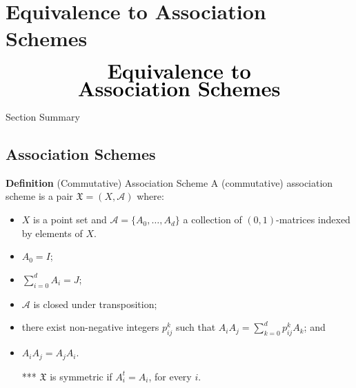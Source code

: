 \documentclass{beamer}
\begin{document}

\section{Equivalence to Association Schemes}

\begin{frame}
  \[
    \begin{array}{c}
      \text{\huge\bf Equivalence to}
      \\
      \text{\huge\bf Association Schemes}
    \end{array}
  \]
\end{frame}

\begin{frame}{Section Summary}
  \tableofcontents[sections={5}]
\end{frame}


\subsection{Association Schemes}

\begin{frame}

  \begin{block}{{\bf Definition} (Commutative) Association Scheme}
    A (commutative) association scheme is a pair $\mathfrak{X}=(X,\mathscr{A})$
    where:
    \begin{itemize}
    \item $X$ is a point set and $\mathscr{A}=\{A_0, \dots, A_d\}$ a collection
      of $(0,1)$-matrices indexed by elements of $X$.
    \item $A_0=I$;
    \item $\displaystyle{\sum_{i=0}^d A_i} = J$;
    \item $\mathscr{A}$ is closed under transposition;
    \item there exist non-negative integers $p_{ij}^k$ such that $A_iA_j =
      \displaystyle{\sum_{k=0}^d p_{ij}^kA_k}$; and
    \item $A_iA_j=A_jA_i$.
    \item[***] $\mathfrak{X}$ is symmetric if $A_i^t=A_i$, for every $i$.
    \end{itemize}
  \end{block}
  
\end{frame}
\end{document}

